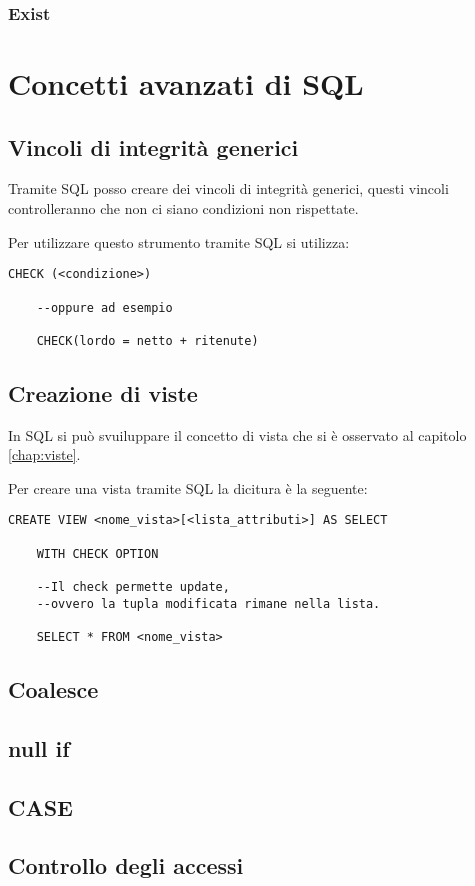 \subsubsection{Exist}

\section{Concetti avanzati di SQL}

\subsection{Vincoli di integrità generici}

Tramite SQL posso creare dei vincoli di integrità generici, questi vincoli controlleranno che non ci siano condizioni non rispettate.

Per utilizzare questo strumento tramite SQL si utilizza:

\begin{lstlisting}[caption= Utilizzo di CHECK]
    CHECK (<condizione>)
    
    --oppure ad esempio
    
    CHECK(lordo = netto + ritenute)
\end{lstlisting}

\subsection{Creazione di viste}

In SQL si può svuiluppare il concetto di vista che si è osservato al capitolo \ref{chap:viste}.

Per creare una vista tramite SQL la dicitura è la seguente:

\begin{lstlisting}[caption=Creazione di viste]
    CREATE VIEW <nome_vista>[<lista_attributi>] AS SELECT
    
    WITH CHECK OPTION
    
    --Il check permette update,
    --ovvero la tupla modificata rimane nella lista.
    
    SELECT * FROM <nome_vista>
\end{lstlisting}

\subsection{Coalesce}

\subsection{null if}

\subsection{CASE}

\subsection{Controllo degli accessi}
